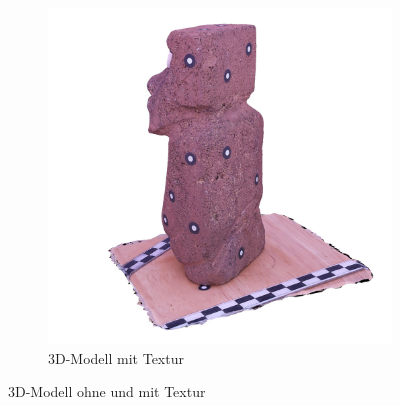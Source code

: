 \documentclass[./00PhotoBox.tex]{subfiles}
\begin{document}
\begin{figure}
\begin{subfigure}{0.49\textwidth}
        \includegraphics[width=1\linewidth]{img/textur.jpg}
        \centering
        \caption{3D-Modell mit Textur} %
        \label{img:mit_textur} %
    \end{subfigure}
    \caption{3D-Modell ohne und mit Textur} %
    \label{img:texturierung} %
\end{figure}

\biblio
\end{document}
